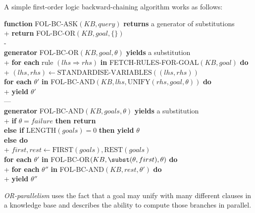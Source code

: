 \documentclass{article}
\begin{document}
\begin{definition}
    \newcommand{\func}{\textbf{function }}
    \newcommand{\return}{\textbf{return }}
    \newcommand{\returns}{\textbf{returns }}
    \newcommand{\generator}{\textbf{generator }}
    \newcommand{\foreach}[2]{\textbf{for each} #1 \textbf{in} #2 \textbf{do}}
    A simple first-order logic backward-chaining algorithm works as follows:
    \begin{pseudo}
        \func FOL-BC-ASK$(KB,query)$ \returns a generator of substitutions\\+
            \return FOL-BC-OR$(KB,goal,\{\})$\\-
        \\
        \generator FOL-BC-OR$(KB, goal, \theta)$ \textbf{yields} a substitution\\+
            \foreach{rule $(lhs\Rightarrow rhs)$}{FETCH-RULES-FOR-GOAL$(KB, goal)$}\\+
                $(lhs,rhs)\leftarrow\text{STANDARDISE-VARIABLES}((lhs, rhs))$\\
                \foreach{$\theta'$}{FOL-BC-AND$(KB,lhs,\text{UNIFY}(rhs,goal,\theta))$}\\+
                    \textbf{yield} $\theta'$\\---
        \\
        \generator FOL-BC-AND$(KB,goals,\theta)$ \textbf{yields} a substitution\\+
            \textbf{if} $\theta=failure$ \textbf{then return}\\
            \textbf{else if} LENGTH$(goals)=0$ \textbf{then yield} $\theta$\\
            \textbf{else do}\\+
                $first,rest\leftarrow \text{FIRST}(goals),\text{REST}(goals)$\\
                \foreach{$\theta'$}{FOL-BC-OR$(KB,\subst(\theta,first),\theta)$}\\+
                    \foreach{$\theta''$}{FOL-BC-AND$(KB,rest,\theta')$}\\+
                        \textbf{yield} $\theta''$

    \end{pseudo}
\end{definition}

\begin{definition}
    \emph{OR-parallelism} uses the fact that a goal may unify with many different
    clauses in a knowledge base and describes the ability to compute those branches
    in parallel.
\end{definition}
\end{document}
